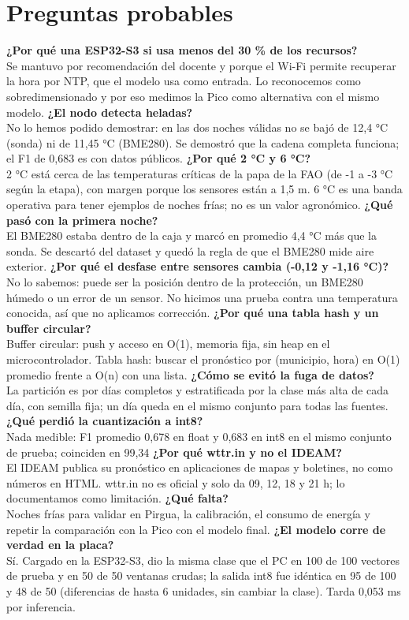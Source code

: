 \documentclass[11pt,a4paper]{article}
\begin{document}
\section*{Preguntas probables}
\textbf{¿Por qué una ESP32-S3 si usa menos del 30 \% de los recursos?}\\ Se mantuvo por recomendación del docente y porque el Wi-Fi permite recuperar la hora por NTP, que el modelo usa como entrada. Lo reconocemos como sobredimensionado y por eso medimos la Pico como alternativa con el mismo modelo.
\textbf{¿El nodo detecta heladas?}\\ No lo hemos podido demostrar: en las dos noches válidas no se bajó de 12,4 °C (sonda) ni de 11,45 °C (BME280). Se demostró que la cadena completa funciona; el F1 de 0,683 es con datos públicos.
\textbf{¿Por qué 2 °C y 6 °C?}\\ 2 °C está cerca de las temperaturas críticas de la papa de la FAO (de -1 a -3 °C según la etapa), con margen porque los sensores están a 1,5 m. 6 °C es una banda operativa para tener ejemplos de noches frías; no es un valor agronómico.
\textbf{¿Qué pasó con la primera noche?}\\ El BME280 estaba dentro de la caja y marcó en promedio 4,4 °C más que la sonda. Se descartó del dataset y quedó la regla de que el BME280 mide aire exterior.
\textbf{¿Por qué el desfase entre sensores cambia (-0,12 y -1,16 °C)?}\\ No lo sabemos: puede ser la posición dentro de la protección, un BME280 húmedo o un error de un sensor. No hicimos una prueba contra una temperatura conocida, así que no aplicamos corrección.
\textbf{¿Por qué una tabla hash y un buffer circular?}\\ Buffer circular: push y acceso en O(1), memoria fija, sin heap en el microcontrolador. Tabla hash: buscar el pronóstico por (municipio, hora) en O(1) promedio frente a O(n) con una lista.
\textbf{¿Cómo se evitó la fuga de datos?}\\ La partición es por días completos y estratificada por la clase más alta de cada día, con semilla fija; un día queda en el mismo conjunto para todas las fuentes.
\textbf{¿Qué perdió la cuantización a int8?}\\ Nada medible: F1 promedio 0,678 en float y 0,683 en int8 en el mismo conjunto de prueba; coinciden en 99,34 %
\textbf{¿Por qué wttr.in y no el IDEAM?}\\ El IDEAM publica su pronóstico en aplicaciones de mapas y boletines, no como números en HTML. wttr.in no es oficial y solo da 09, 12, 18 y 21 h; lo documentamos como limitación.
\textbf{¿Qué falta?}\\ Noches frías para validar en Pirgua, la calibración, el consumo de energía y repetir la comparación con la Pico con el modelo final.
\textbf{¿El modelo corre de verdad en la placa?}\\ Sí. Cargado en la ESP32-S3, dio la misma clase que el PC en 100 de 100 vectores de prueba y en 50 de 50 ventanas crudas; la salida int8 fue idéntica en 95 de 100 y 48 de 50 (diferencias de hasta 6 unidades, sin cambiar la clase). Tarda 0,053 ms por inferencia.
\end{document}
